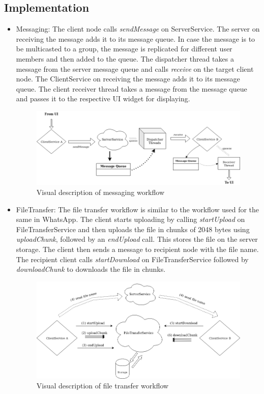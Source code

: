 \documentclass[a4paper,10pt]{article}
\begin{document}
\subsection{Implementation}
\begin{itemize}
    \item Messaging: The client node calls \textit{sendMessage} on ServerService. The server on receiving the message adds it to its message queue. In case the message is to be multicasted to a group, the message is replicated for different user members and then added to the queue. The dispatcher thread takes a message from the server message queue and calls \textit{receive} on the target client node. The ClientService on receiving the message adds it to its message queue. The client receiver thread takes a message from the message queue and passes it to the respective UI widget for displaying.
    \begin{figure}[h]
        \includegraphics[scale=0.4]{messageWorkflow}
        \caption{Visual description of messaging workflow}
        \label{fig:diagram1}
    \end{figure}
    
    \item FileTransfer: The file transfer workflow is similar to the workflow used for the same in WhatsApp. The client starts uploading by calling \textit{startUpload} on FileTransferService and then uploads the file in chunks of 2048 bytes using \textit{uploadChunk}, followed by an \textit{endUpload} call. This stores the file on the server storage. The client then sends a message to recipient node with the file name. The recipient client calls \textit{startDownload} on FileTransferService followed by \textit{downloadChunk} to downloads the file in chunks.
    \begin{figure}[h]
        \hspace{1cm}
        \includegraphics[scale=0.35]{FileTransferWorkflow}
        \caption{Visual description of file transfer workflow}
        \label{fig:diagram2}
    \end{figure}
    
\end{itemize}
\end{document}
